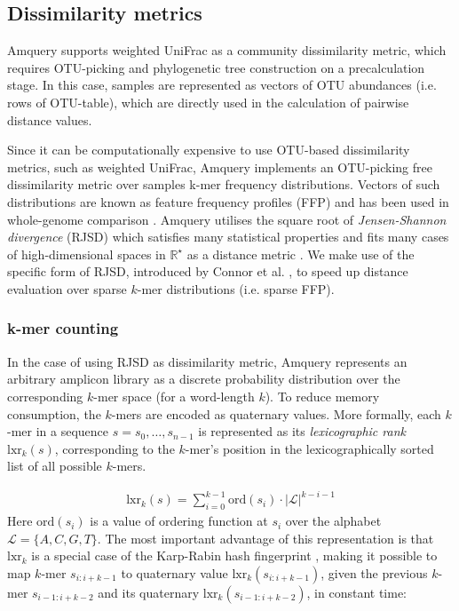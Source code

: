 \documentclass[10pt,letterpaper]{article}
\begin{document}
\subsection*{Dissimilarity metrics}
Amquery supports weighted UniFrac \cite{lozupone2011unifrac} as a community dissimilarity metric,
 which requires OTU-picking and phylogenetic tree construction on a precalculation stage. In this case, 
 samples are represented as vectors of OTU abundances (i.e. rows of OTU-table), which are directly used 
 in the calculation of pairwise distance values.


Since it can be computationally expensive to use OTU-based dissimilarity metrics, such as weighted UniFrac, Amquery 
implements an OTU-picking free dissimilarity metric over samples k-mer frequency distributions. Vectors of such distributions
are known as feature frequency profiles (FFP) and has been used in whole-genome comparison \cite{sims2009alignment}. 
Amquery utilises the square root of \textit{Jensen-Shannon divergence} (RJSD) \cite{lin1991divergence} which 
satisfies many statistical properties and fits many cases of high-dimensional spaces in $\mathbb{R^\star}$ as a distance 
metric \cite{fuglede2004jensen, endres2003new}. We make use of the specific form of RJSD, introduced 
by Connor et al. \cite{connor2013evaluation}, to speed up distance evaluation over sparse $k$-mer distributions (i.e. sparse FFP).


\subsubsection*{k-mer counting}
In the case of using RJSD as dissimilarity metric, Amquery represents an arbitrary amplicon library as a discrete 
probability distribution over the corresponding $k$-mer space (for a word-length $k$). 
To reduce memory consumption, the $k$-mers are encoded as quaternary values. 
More formally, each $k$-mer in a sequence $s = s_0,\dots,s_{n-1}$ is represented as its \textit{lexicographic rank} $\mathrm{lxr}_k(s)$, corresponding to the $k$-mer's position in the lexicographically sorted list of all possible $k$-mers.

\begin{eqnarray}
\label{eq:schemeP}
    \mathrm{lxr}_k(s) = \sum_{i=0}^{k−1} \mathrm{ord}(s_i) \cdot |{\mathcal{L}}|^{k−i−1}
\end{eqnarray}
Here $\mathrm{ord}(s_i)$ is a value of ordering function at $s_i$ over the alphabet ${\mathcal{L}} = \{A, C, G, T \}$. The most important advantage of this representation is that $\mathrm{lxr}_k$ is a special case of the Karp-Rabin hash fingerprint \cite{karp1987efficient}, making it possible to map $k$-mer $s_{i:i+k-1}$ to quaternary value $\mathrm{lxr}_k(s_{i:i+k-1})$, given the previous $k$-mer $s_{i−1:i+k-2}$ and its quaternary $\mathrm{lxr}_k(s_{i−1:i+k-2})$, in constant time:
\end{document}
